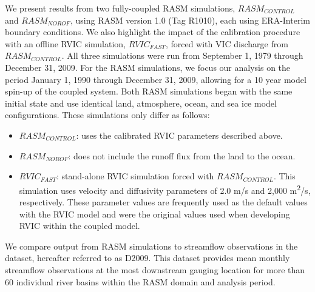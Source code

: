 \documentclass[jgrga, draft]{agutex}
\begin{document}
\begin{article}
We present results from two fully-coupled RASM simulations, $RASM_{CONTROL}$ and $RASM_{NOROF}$, using RASM version 1.0 (Tag R1010), each using ERA-Interim boundary conditions.
We also highlight the impact of the calibration procedure with an offline RVIC simulation, $RVIC_{FAST}$, forced with VIC discharge from $RASM_{CONTROL}$.
All three simulations were run from September 1, 1979 through December 31, 2009.
For the RASM simulations, we focus our analysis on the period January 1, 1990 through December 31, 2009, allowing for a 10 year model spin-up of the coupled system.
Both RASM simulations began with the same initial state \citep[see][]{Hamman_2016} and use identical land, atmosphere, ocean, and sea ice model configurations.
These simulations only differ as follows:
\begin{itemize}
     \item $RASM_{CONTROL}$: uses the calibrated RVIC parameters described above.
     \item $RASM_{NOROF}$: does not include the runoff flux from the land to the ocean.
     \item $RVIC_{FAST}$: stand-alone RVIC simulation forced with $RASM_{CONTROL}$.
          This simulation uses velocity and diffusivity parameters of 2.0 m/s and 2,000 m\textsuperscript{2}/s, respectively.
          These parameter values are frequently used as the default values with the RVIC model and were the original values used when developing RVIC within the coupled model. %
\end{itemize}

We compare output from RASM simulations to streamflow observations in the \citet{Dai_2009} dataset, hereafter referred to as D2009. %
This dataset provides mean monthly streamflow observations at the most downstream gauging location for more than 60 individual river basins within the RASM domain and analysis period. %


\end{article}
\end{document}
